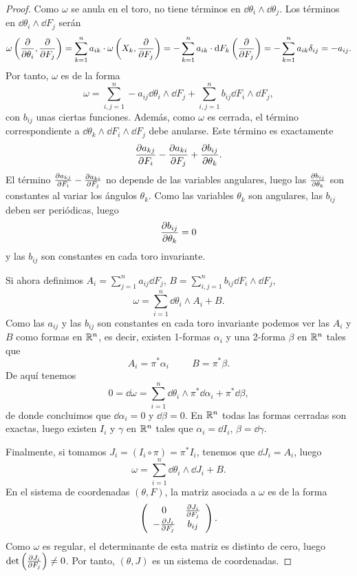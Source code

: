 \begin{proof}
Como $\omega$ se anula en el toro, no tiene términos en $\dd \theta_i \wedge \dd \theta_j$. Los términos en $\dd \theta_i \wedge \dd F_j$ serán
\[
  \omega\left(\frac{\partial}{\partial \theta_i},\frac{\partial}{\partial F_j}\right)=\sum_{k=1}^n a_{ik}\cdot \omega\left(X_k,\frac{\partial}{\partial F_j}\right)=-\sum_{k=1}^n a_{ik} \cdot \mathrm{d} F_k \left(\frac{\partial}{\partial F_j}\right) = -\sum_{k=1}^n a_{ik} \delta_{ij}= -a_{ij}. 
\]
Por tanto, $\omega$ es de la forma
\[
  \omega = \sum_{i,j=1}^n -a_{ij} \dd \theta_i \wedge \dd F_j + \sum_{i,j=1}^n b_{ij} \dd F_i \wedge \dd F_j,
\]
con $b_{ij}$ unas ciertas funciones. Además, como $\omega$ es cerrada, el término correspondiente a $\dd \theta_k \wedge \dd F_i \wedge \dd F_j$ debe anularse. Este término es exactamente
\[
  \frac{\partial a_{kj}}{\partial F_i}-\frac{\partial a_{ki}}{\partial F_j}+\frac{\partial b_{ij}}{\partial \theta_k}.
\]
El término $\frac{\partial a_{kj}}{\partial F_i}-\frac{\partial a_{ki}}{\partial F_j}$ no depende de las variables angulares, luego las $\frac{\partial b_{ij}}{\partial \theta_k}$ son constantes al variar los ángulos $\theta_k$. Como las variables $\theta_k$ son angulares, las $b_{ij}$ deben ser periódicas, luego
\[
  \frac{\partial b_{ij}}{\partial \theta_k}=0
\]
y las $b_{ij}$ son constantes en cada toro invariante.

Si ahora definimos $A_i=\sum_{j=1}^n a_{ij}\dd F_j$, $B=\sum_{i,j=1}^n b_{ij}\dd F_i \wedge \dd F_j$,
\[
  \omega=\sum_{i=1}^n \dd \theta_i \wedge A_i + B.
\]
Como las $a_{ij}$ y las $b_{ij}$ son constantes en cada toro invariante podemos ver las $A_i$ y $B$ como formas en $\mathbb{R}^n$, es decir, existen 1-formas $\alpha_i$ y una 2-forma $\beta$ en $\mathbb{R}^n$ tales que
\[
  A_i= \pi^* \alpha_i \hspace{1cm} B=\pi^* \beta.
\]
De aquí tenemos
\[
  0=\dd \omega= \sum_{i=1}^n \dd \theta_i \wedge \pi^* \dd \alpha_i + \pi^* \dd \beta,
\]
de donde concluimos que $\dd \alpha_i = 0$ y $\dd \beta =0$. En $\mathbb{R}^n$ todas las formas cerradas son exactas, luego existen $I_i$ y $\gamma$ en $\mathbb{R}^n$ tales que $\alpha_i = \dd I_i$, $\beta= \dd \gamma$.

Finalmente, si tomamos $J_i=(I_i \circ \pi)=\pi^* I_i$, tenemos que $\dd J_i = A_i$, luego
\[
  \omega = \sum_{i=1}^n \dd \theta_i \wedge \dd J_i + B.
\]
En el sistema de coordenadas $(\theta,F)$, la matriz asociada a $\omega$ es de la forma
\[
\left(
\begin{array}{cc}
  0 & \frac{\partial J_i}{\partial F_j} \\
  -\frac{\partial J_i}{\partial F_j} & b_{ij}
\end{array}\right).
\]
Como $\omega$ es regular, el determinante de esta matriz es distinto de cero, luego $\det\left(\frac{\partial J_i}{\partial F_j}\right)\neq 0$. Por tanto, $(\theta,J)$ es un sistema de coordenadas.


\end{proof}
